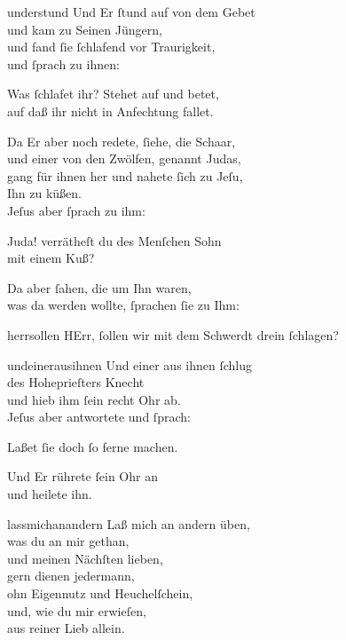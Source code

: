 \documentclass[tocstyle=ref-genre]{ees}
\begin{document}
{\begin{movement}{understund}
  \voice[Evangelist]
  Und Er ſtund auf von dem Gebet\\
  und kam zu Seinen Jüngern,\\
  und fand ſie ſchlafend vor Traurigkeit,\\
  und ſprach zu ihnen:

  \voice[Jesus]
  Was ſchlafet ihr? Stehet auf und betet,\\
  auf daß ihr nicht in Anfechtung fallet.

  \voice[Evangelist]
  Da Er aber noch redete, ſiehe, die Schaar,\\
  und einer von den Zwölfen, genannt Judas,\\
  gang für ihnen her und nahete ſich zu Jeſu,\\
  Ihn zu küßen.\\
  Jeſus aber ſprach zu ihm:

  \voice[Jesus]
  Juda! verrätheſt du des Menſchen Sohn\\
  mit einem Kuß?

  \voice[Evangelist]
  Da aber ſahen, die um Ihn waren,\\
  was da werden wollte, ſprachen ſie zu Ihm:
\end{movement}

\begin{movement}{herrsollen}
  \voice[Chor]
  HErr, ſollen wir mit dem Schwerdt drein ſchlagen?
\end{movement}

\begin{movement}{undeinerausihnen}
  \voice[Evangelist]
  Und einer aus ihnen ſchlug\\
  des Hoheprieſters Knecht\\
  und hieb ihm ſein recht Ohr ab.\\
  Jeſus aber antwortete und ſprach:

  \voice[Jesus]
  Laßet ſie doch ſo ferne machen.

  \voice[Evangelist]
  Und Er rührete ſein Ohr an\\
  und heilete ihn.
\end{movement}

\begin{movement}{lassmichanandern}
  \voice[Chor]
  Laß mich an andern üben,\\
  was du an mir gethan,\\
  und meinen Nächſten lieben,\\
  gern dienen jedermann,\\
  ohn Eigennutz und Heuchelſchein,\\
  und, wie du mir erwieſen,\\
  aus reiner Lieb allein.
\end{movement}

}
\end{document}
